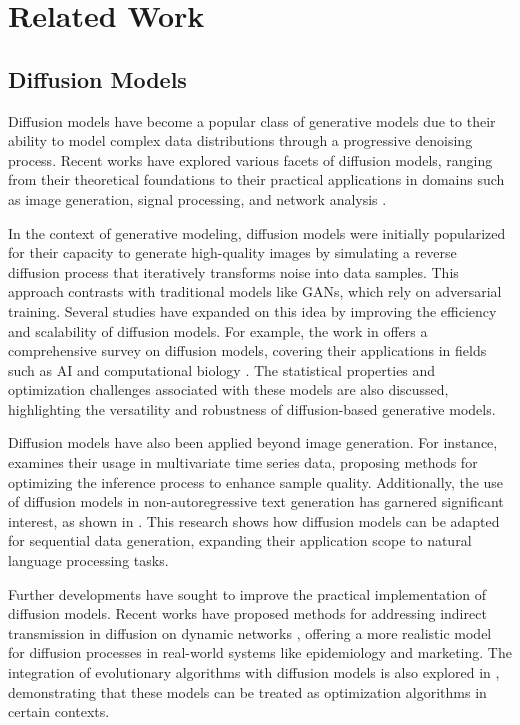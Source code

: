 \section{Related Work}
\subsection{Diffusion Models}

Diffusion models have become a popular class of generative models due to their ability to model complex data distributions through a progressive denoising process. Recent works have explored various facets of diffusion models, ranging from their theoretical foundations to their practical applications in domains such as image generation, signal processing, and network analysis \cite{wang2024insectmamba}.

In the context of generative modeling, diffusion models were initially popularized for their capacity to generate high-quality images by simulating a reverse diffusion process that iteratively transforms noise into data samples. This approach contrasts with traditional models like GANs, which rely on adversarial training. Several studies have expanded on this idea by improving the efficiency and scalability of diffusion models. For example, the work in \cite{chen2024overview} offers a comprehensive survey on diffusion models, covering their applications in fields such as AI and computational biology \cite{wang2024diffusion}. The statistical properties and optimization challenges associated with these models are also discussed, highlighting the versatility and robustness of diffusion-based generative models.

Diffusion models have also been applied beyond image generation. For instance, \cite{li2023multivariate} examines their usage in multivariate time series data, proposing methods for optimizing the inference process to enhance sample quality. Additionally, the use of diffusion models in non-autoregressive text generation has garnered significant interest, as shown in \cite{li2023nonautoregressive}. This research shows how diffusion models can be adapted for sequential data generation, expanding their application scope to natural language processing tasks.

Further developments have sought to improve the practical implementation of diffusion models. Recent works have proposed methods for addressing indirect transmission in diffusion on dynamic networks \cite{shahzamal2019dynamic}, offering a more realistic model for diffusion processes in real-world systems like epidemiology and marketing. The integration of evolutionary algorithms with diffusion models is also explored in \cite{zhang2023diffusion}, demonstrating that these models can be treated as optimization algorithms in certain contexts.


